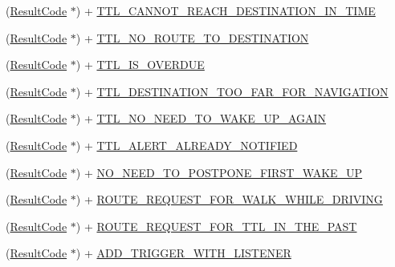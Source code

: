 \begin{DoxyCompactItemize}
(\hyperlink{interface_result_code}{Result\+Code} $\ast$) + \hyperlink{interface_result_code_a811446b7c64137d9b6abb3729bc4f7fa}{T\+T\+L\+\_\+\+C\+A\+N\+N\+O\+T\+\_\+\+R\+E\+A\+C\+H\+\_\+\+D\+E\+S\+T\+I\+N\+A\+T\+I\+O\+N\+\_\+\+I\+N\+\_\+\+T\+I\+M\+E}
\item 
(\hyperlink{interface_result_code}{Result\+Code} $\ast$) + \hyperlink{interface_result_code_ad7bd3ea9e46a8aeb68462c1e4f10aa13}{T\+T\+L\+\_\+\+N\+O\+\_\+\+R\+O\+U\+T\+E\+\_\+\+T\+O\+\_\+\+D\+E\+S\+T\+I\+N\+A\+T\+I\+O\+N}
\item 
(\hyperlink{interface_result_code}{Result\+Code} $\ast$) + \hyperlink{interface_result_code_a4c9d14823d9ecf119c792317929dcc43}{T\+T\+L\+\_\+\+I\+S\+\_\+\+O\+V\+E\+R\+D\+U\+E}
\item 
(\hyperlink{interface_result_code}{Result\+Code} $\ast$) + \hyperlink{interface_result_code_aa261d5bb61e2bf65416336c873e0c22d}{T\+T\+L\+\_\+\+D\+E\+S\+T\+I\+N\+A\+T\+I\+O\+N\+\_\+\+T\+O\+O\+\_\+\+F\+A\+R\+\_\+\+F\+O\+R\+\_\+\+N\+A\+V\+I\+G\+A\+T\+I\+O\+N}
\item 
(\hyperlink{interface_result_code}{Result\+Code} $\ast$) + \hyperlink{interface_result_code_a9156dcb3017e3aa3bc3a642f78207d05}{T\+T\+L\+\_\+\+N\+O\+\_\+\+N\+E\+E\+D\+\_\+\+T\+O\+\_\+\+W\+A\+K\+E\+\_\+\+U\+P\+\_\+\+A\+G\+A\+I\+N}
\item 
(\hyperlink{interface_result_code}{Result\+Code} $\ast$) + \hyperlink{interface_result_code_afdaa45f143cf5a2ae8ec97ba031c966c}{T\+T\+L\+\_\+\+A\+L\+E\+R\+T\+\_\+\+A\+L\+R\+E\+A\+D\+Y\+\_\+\+N\+O\+T\+I\+F\+I\+E\+D}
\item 
(\hyperlink{interface_result_code}{Result\+Code} $\ast$) + \hyperlink{interface_result_code_aa1f141294939c8f002e6e904611132d3}{N\+O\+\_\+\+N\+E\+E\+D\+\_\+\+T\+O\+\_\+\+P\+O\+S\+T\+P\+O\+N\+E\+\_\+\+F\+I\+R\+S\+T\+\_\+\+W\+A\+K\+E\+\_\+\+U\+P}
\item 
(\hyperlink{interface_result_code}{Result\+Code} $\ast$) + \hyperlink{interface_result_code_a392ac3d3bebaa486fd34f0a8ddd1f4e2}{R\+O\+U\+T\+E\+\_\+\+R\+E\+Q\+U\+E\+S\+T\+\_\+\+F\+O\+R\+\_\+\+W\+A\+L\+K\+\_\+\+W\+H\+I\+L\+E\+\_\+\+D\+R\+I\+V\+I\+N\+G}
\item 
(\hyperlink{interface_result_code}{Result\+Code} $\ast$) + \hyperlink{interface_result_code_a0c338f0a4a7bdaabfc3fed2bb0014782}{R\+O\+U\+T\+E\+\_\+\+R\+E\+Q\+U\+E\+S\+T\+\_\+\+F\+O\+R\+\_\+\+T\+T\+L\+\_\+\+I\+N\+\_\+\+T\+H\+E\+\_\+\+P\+A\+S\+T}
\item 
(\hyperlink{interface_result_code}{Result\+Code} $\ast$) + \hyperlink{interface_result_code_a3268649fe82b9f1553e95b9901bf3963}{A\+D\+D\+\_\+\+T\+R\+I\+G\+G\+E\+R\+\_\+\+W\+I\+T\+H\+\_\+\+L\+I\+S\+T\+E\+N\+E\+R}

\end{DoxyCompactItemize}
